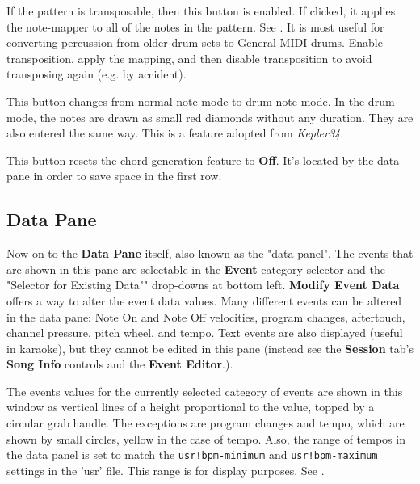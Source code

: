    If the pattern is transposable, then this button is enabled.
   If clicked, it applies the note-mapper to all of the notes in the pattern.
   See .
   It is most useful for converting percussion from older drum sets to
   General MIDI drums.  Enable transposition, apply the mapping, and then
   disable transposition to avoid transposing again (e.g. by accident).

   This button changes from normal note mode to drum note mode. In the drum
   mode, the notes are drawn as small red diamonds without any duration.
   They are also entered the same way.
   This is a feature adopted from \textsl{Kepler34}.

   This button resets the chord-generation feature to \textbf{Off}.
   It's located by the data pane in order to save space in the first row.

\subsection{Data Pane}
\label{subsec:pattern_editor_data_view}

   Now on to the \textbf{Data Pane} itself, also known as the "data panel".
   The events that are shown in this pane
   are selectable in the \textbf{Event} category
   selector and the "Selector for Existing Data"" drop-downs at bottom left.
   \textbf{Modify Event Data} offers a way to
   alter the event data values.
   Many different events can be altered in the data pane:
   Note On and Note Off velocities, program changes, aftertouch, channel
   pressure, pitch wheel, and tempo.
   Text events are also displayed (useful in karaoke), but they cannot be
   edited in this pane
   (instead see the \textbf{Session} tab's \textbf{Song Info} controls and
   the \textbf{Event Editor}.).

   The events values for the currently selected category of events are shown
   in this window as vertical lines of a height proportional to the value,
   topped by a circular grab handle.
   The exceptions are program changes and tempo, which are shown by small
   circles, yellow in the case of tempo.
   Also, the range of tempos in the data panel is set to match the
   \texttt{usr!bpm-minimum}
   and
   \texttt{usr!bpm-maximum}
   settings in the 'usr' file.
   This range is for display purposes.
   See .

